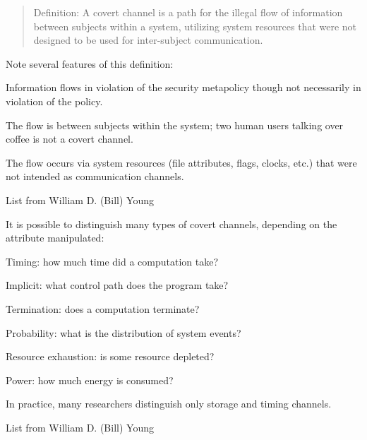 \documentclass[Screen16to9,17pt]{foils}
\begin{document}

\begin{quote}
Definition: A covert channel is a path for the illegal flow of
information between subjects within a system, utilizing system
resources that were not designed to be used for inter-subject
communication.
\end{quote}

\begin{list1}
\item Note several features of this definition:
\begin{list2}
\item Information flows in violation of the security metapolicy
though not necessarily in violation of the policy.
\item The flow is between subjects within the system; two human
users talking over coffee is not a covert channel.
\item The flow occurs via system resources (file attributes, flags,
clocks, etc.) that were not intended as communication
channels.
\end{list2}
\end{list1}

List from William D. (Bill) Young



\begin{list1}
\item It is possible to distinguish many types of covert channels,
depending on the attribute manipulated:
\begin{list2}
\item Timing: how much time did a computation take?
\item Implicit: what control path does the program take?
\item Termination: does a computation terminate?
\item Probability: what is the distribution of system events?
\item Resource exhaustion: is some resource depleted?
\item Power: how much energy is consumed?
\end{list2}
\item In practice, many researchers distinguish only storage and timing
channels.
\end{list1}

List from William D. (Bill) Young
\end{document}
